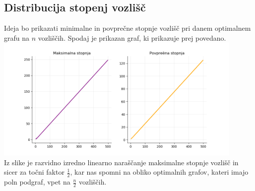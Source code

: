 \documentclass[ letterpaper, titlepage, fleqn]{article}
\begin{document}
\subsection{Distribucija stopenj vozlišč}
Ideja bo prikazati minimalne in povprečne stopnje vozlišč pri danem optimalnem grafu na $n$ vozliščih.
Spodaj je prikazan graf, ki prikazuje prej povedano. \\
\includegraphics[width=\textwidth, height=6cm]{graphics/degree_distribution.png}\\
Iz slike je razvidno izredno linearno naraščanje maksimalne stopnje vozlišč in sicer za točni faktor $\frac{1}{2}$,
kar nas spomni na obliko optimalnih grafov, kateri imajo poln podgraf, vpet na $\frac{n}{2}$ vozliščih.
\end{document}
